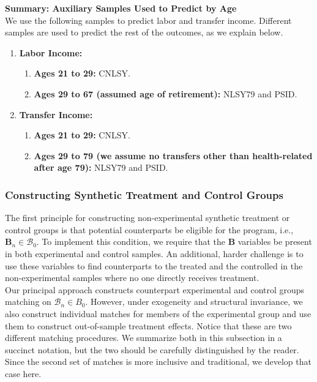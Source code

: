 \noindent \textbf{Summary: Auxiliary Samples Used to Predict by Age}\\
We use the following samples to predict labor and transfer income. Different samples are used to predict the rest of the outcomes, as we explain below.
\begin{enumerate}
\item \textbf{Labor Income:}
\begin{enumerate}
\item \textbf{Ages 21 to 29:} CNLSY.
\item \textbf{Ages 29 to 67 (assumed age of retirement):} NLSY79 and PSID.
\end{enumerate}
\item \textbf{Transfer Income:}
\begin{enumerate}
\item \textbf{Ages 21 to 29:} CNLSY.
\item \textbf{Ages 29 to 79 (we assume no transfers other than health-related after age 79):} NLSY79 and PSID.
\end{enumerate}
\end{enumerate}

\subsubsection{Constructing Synthetic Treatment and Control Groups}\label{appendix:match}

\noindent The first principle for constructing non-experimental synthetic treatment or control groups is that potential counterparts be eligible for the program, i.e., $\bm{B}_n \in \mathcal{B}_{0}$. To implement this condition, we require that the $\bm{B}$ variables be present in both experimental and control samples. An additional, harder challenge is to use these variables to find counterparts to the treated and the controlled in the non-experimental samples where no one directly receives treatment.\\

\noindent Our principal approach constructs counterpart experimental and control groups matching on $\mathcal{B}_n \in B_0$. However, under exogeneity and structural invariance, we also construct individual matches for members of the experimental group and use them to construct out-of-sample treatment effects. Notice that these are two different matching procedures. We summarize both in this subsection in a succinct notation, but the two should be carefully distinguished by the reader. Since the second set of matches is more inclusive and traditional, we develop that case here.\\

